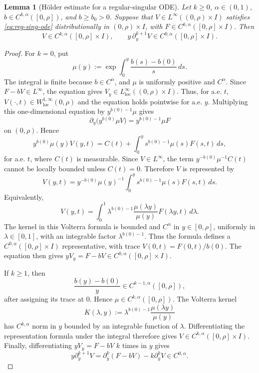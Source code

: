 \documentclass[11pt]{amsart}
\newtheorem{lemma}[theorem]{Lemma}
\newcommand{\dd}{\,d}
\newcommand{\loc}{\mathrm{loc}}
\begin{document}
\begin{lemma}[H\"older estimate for a regular-singular ODE]
\label{lem:regular-singular-descent}
Let \(k\ge0\), \(\alpha\in(0,1)\), \(b\in C^{k,\alpha}([0,\rho])\), and
\(b\ge b_0>0\). Suppose that \(V\in L^\infty((0,\rho)\times I)\) satisfies
\eqref{eq:reg-sing-ode} distributionally in \((0,\rho)\times I\), with
\(F\in C^{k,\alpha}([0,\rho]\times I)\).
Then
\[
        V\in C^{k,\alpha}([0,\rho]\times I),
        \qquad
        y\,\partial_y^{k+1}V\in C^{0,\alpha}([0,\rho]\times I).
\]
\end{lemma}

\begin{proof}
For \(k=0\), put
\[
        \mu(y):=\exp\int_0^y\frac{b(s)-b(0)}s\dd s .
\]
The integral is finite because \(b\in C^\alpha\), and \(\mu\) is
uniformly positive and \(C^\alpha\). Since \(F-bV\in L^\infty\), the equation gives
\(V_y\in L^\infty_{\loc}((0,\rho)\times I)\). Thus, for a.e. \(t\),
\(V(\cdot,t)\in W^{1,\infty}_{\loc}(0,\rho)\) and the equation holds
pointwise for a.e. \(y\). Multiplying this one-dimensional equation by
\(y^{b(0)-1}\mu\) gives
\[
        \partial_y\bigl(y^{b(0)}\mu V\bigr)
        =y^{b(0)-1}\mu F
\]
on \((0,\rho)\). Hence
\[
        y^{b(0)}\mu(y)V(y,t)
        =
        C(t)+\int_0^y s^{b(0)-1}\mu(s)F(s,t)\dd s ,
\]
for a.e. \(t\), where \(C(t)\) is measurable. Since \(V\in L^\infty\), the
term \(y^{-b(0)}\mu^{-1}C(t)\) cannot be locally bounded unless \(C(t)=0\).
Therefore \(V\) is represented by
\[
        V(y,t)=
        y^{-b(0)}\mu(y)^{-1}
        \int_0^y s^{b(0)-1}\mu(s)F(s,t)\dd s .
\]
Equivalently,
\[
        V(y,t)=
        \int_0^1\lambda^{b(0)-1}
        \frac{\mu(\lambda y)}{\mu(y)}F(\lambda y,t)\dd\lambda .
\]
The kernel in this Volterra formula is bounded and \(C^\alpha\) in
\(y\in[0,\rho]\), uniformly in \(\lambda\in[0,1]\), with an integrable
factor \(\lambda^{b(0)-1}\). Thus the formula defines a
\(C^{0,\alpha}([0,\rho]\times I)\) representative, with trace
\(V(0,t)=F(0,t)/b(0)\). The equation then gives
\(y V_y=F-bV\in C^{0,\alpha}([0,\rho]\times I)\).

If \(k\ge1\), then
\[
        \frac{b(y)-b(0)}{y}\in C^{k-1,\alpha}([0,\rho]),
\]
after assigning its trace at \(0\). Hence \(\mu\in C^{k,\alpha}([0,\rho])\).
The Volterra kernel
\[
        K(\lambda,y):=\lambda^{b(0)-1}
        \frac{\mu(\lambda y)}{\mu(y)}
\]
has \(C^{k,\alpha}\) norm in \(y\) bounded by an integrable function of
\(\lambda\). Differentiating the representation formula under the integral
therefore gives \(V\in C^{k,\alpha}([0,\rho]\times I)\). Finally,
differentiating \(y V_y=F-bV\) \(k\) times in \(y\) gives
\[
        y\partial_y^{k+1}V
        =\partial_y^k(F-bV)-k\partial_y^kV\in C^{0,\alpha}.
\]
\end{proof}
\end{document}

